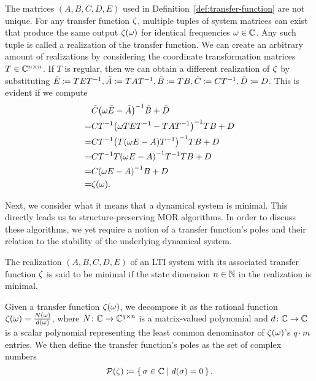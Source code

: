 \begin{remark}
    The matrices $(A, B, C, D, E)$ used in Definition~\ref{def:transfer-function} are not unique.
    For any transfer function $\zeta$, multiple tuples of system matrices can exist that produce the same output $\zeta(\omega)$ for identical frequencies $\omega \in \mathbb{C}$.
    Any such tuple is called a realization of the transfer function.
    We can create an arbitrary amount of realizations by considering the coordinate transformation matrices $T \in \mathbb{C}^{n \times n}$.
    If $T$ is regular, then we can obtain a different realization of $\zeta$ by substituting $\tilde{E} \coloneqq T E T\inv, \tilde{A} \coloneqq T A T\inv, \tilde{B} \coloneqq T B, \tilde{C} \coloneqq C T\inv, \tilde{D} \coloneqq D$.
    This is evident if we compute
    \begin{align*}
        &\tilde{C} {\left( \omega \tilde{E} - \tilde{A} \right)}\inv \tilde{B} + \tilde{D} \\
        = &C T\inv {\left( \omega T E T\inv - T A T\inv \right)}\inv T B + D \\
        = &C T\inv {\left( T (\omega E - A) T\inv \right)}\inv T B + D \\
        = &C T\inv T {\left( \omega E - A \right)}\inv T\inv T B + D \\
        = &C {(\omega E - A)}\inv B + D \\
        = &\tfunc(\omega).
    \end{align*}
\end{remark}

Next, we consider what it means that a dynamical system is minimal.
This directly leads us to structure-preserving \ac{MOR} algorithms.
In order to discuss these algorithms, we yet require a notion of a transfer function's poles and their relation to the stability of the underlying dynamical system.

\begin{definition}\label{def:minimal-system}
    The realization $(A, B, C, D, E)$ of an \ac{LTI} system with its associated transfer function $\zeta$ is said to be minimal if the state dimension $n \in \mathbb{N}$ in the realization is minimal.
\end{definition}

\begin{definition}\label{def:transfer-function-poles}
    Given a transfer function $\zeta(\omega)$, we decompose it as the rational function $\zeta(\omega) = \frac{N(\omega)}{d(\omega)}$, where $N \colon \mathbb{C} \to \mathbb{C}^{q \times n}$ is a matrix-valued polynomial and $d \colon \mathbb{C} \to \mathbb{C}$ is a scalar polynomial representing the least common denominator of $\zeta(\omega)$'s $q \cdot m$ entries.
    We then define the transfer function's poles as the set of complex numbers
    \begin{equation*}
        \mathcal{P}(\zeta) \coloneqq \left\{\,\sigma \in \mathbb{C}\mid d(\sigma) = 0\,\right\}.
    \end{equation*}
\end{definition}

